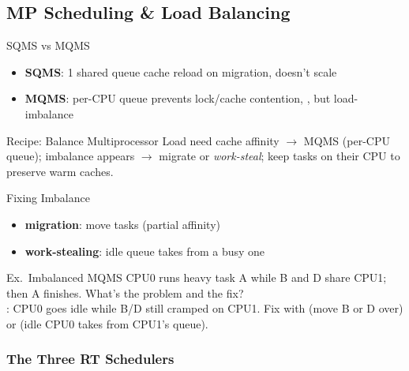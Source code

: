 \multend

\subsection{MP Scheduling \& Load Balancing}


\begin{definition}{SQMS vs MQMS}
    \begin{itemize}
        \item \textbf{SQMS}: 1 shared queue cache reload on migration, doesn't scale
        \item \textbf{MQMS}: per-CPU queue prevents lock/cache contention, , but load-imbalance
    \end{itemize}
\end{definition}

\begin{KR}{Recipe: Balance Multiprocessor Load}
    need cache affinity $\to$ MQMS (per-CPU queue); imbalance appears $\to$ migrate or \emph{work-steal}; keep tasks on their CPU to preserve warm caches.
\end{KR}

\begin{concept}{Fixing Imbalance}
    \begin{itemize}
        \item \textbf{migration}: move tasks (partial affinity)
        \item \textbf{work-stealing}: idle queue takes from a busy one
    \end{itemize}
\end{concept}





\begin{example2}{Ex.\ Imbalanced MQMS}
    CPU0 runs heavy task A while B and D share CPU1; then A finishes. What's the problem and the fix?
     \\ 
    : CPU0 goes idle while B/D still cramped on CPU1. Fix with  (move B or D over) or  (idle CPU0 takes from CPU1's queue).
\end{example2}

\multend

\subsubsection{The Three RT Schedulers}

